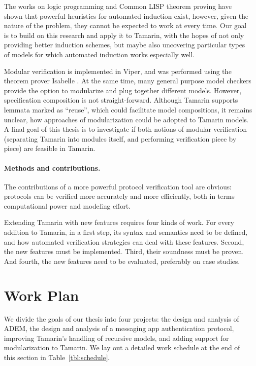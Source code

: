 \documentclass{article}
\begin{document}
The works on logic programming and Common LISP theorem proving have shown that powerful heuristics for automated induction exist, however, given the nature of the problem, they cannot be expected to work at every time.
Our goal is to build on this research and apply it to Tamarin, with the hopes of not only providing better induction schemes, but maybe also uncovering particular types of models for which automated induction works especially well.

Modular verification is implemented in Viper, and was performed using the theorem prover Isabelle \cite{Isabelle,Igloo}.
At the same time, many general purpose model checkers provide the option to modularize and plug together different models.
However, specification composition is not straight-forward.
Although Tamarin supports lemmata marked as ``reuse'', which could facilitate model compositions, it remains unclear, how approaches of modularization could be adopted to Tamarin models.
A final goal of this thesis is to investigate if both notions of modular verification (separating Tamarin into modules itself, and performing verification piece by piece) are feasible in Tamarin.

\paragraph{Methods and contributions.}
The contributions of a more powerful protocol verification tool are obvious: protocols can be verified more accurately and more efficiently, both in terms computational power and modeling effort.

Extending Tamarin with new features requires four kinds of work.
For every addition to Tamarin, in a first step, its syntax and semantics need to be defined, and how automated verification strategies can deal with these features.
Second, the new features must be implemented.
Third, their soundness must be proven.
And fourth, the new features need to be evaluated, preferably on case studies.

\section{Work Plan}

We divide the goals of our thesis into four projects: the design and analysis of \gls{ADEM}, the design and analysis of a messaging app authentication protocol, improving Tamarin's handling of recursive models, and adding support for modularization to Tamarin.
We lay out a detailed work schedule at the end of this section in Table~\ref{tbl:schedule}.
\end{document}
